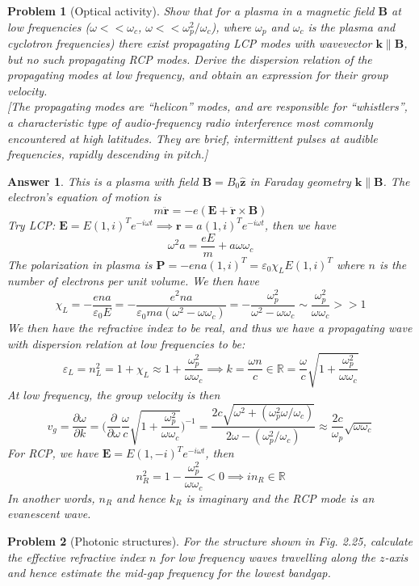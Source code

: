 \documentclass[a4paper]{article}
\newtheorem{ans}{Answer}
\theoremstyle{new}
\newtheorem{qns}{Problem}
\begin{document}
\begin{qns}[Optical activity]
Show that for a plasma in a magnetic field $\mathbf{B}$ at low frequencies ($\omega<<\omega_c$, $\omega<<\omega_p^2/\omega_c$), where $\omega_p$ and $\omega_c$ is the plasma and cyclotron frequencies) there exist propagating LCP modes with wavevector $\mathbf{k}\parallel\mathbf{B}$, but no such propagating RCP modes. Derive the dispersion relation of the propagating modes at low frequency, and obtain an expression for their group velocity.\\[5pt]
[The propagating modes are “helicon” modes, and are responsible for “whistlers”, a characteristic type of audio-frequency radio interference most commonly encountered at high latitudes. They are brief, intermittent pulses at audible frequencies, rapidly descending in pitch.]
\end{qns}
\newpage
\begin{ans}
This is a plasma with field $\mathbf{B}=B_0\mathbf{\hat{z}}$ in Faraday geometry $\mathbf{k}\parallel\mathbf{B}$. The electron's equation of motion is
$$m\mathbf{\ddot{r}}=-e(\mathbf{E}+\mathbf{\ddot{r}}\times\mathbf{B})$$
Try LCP: $\mathbf{E}=E(1,i)^Te^{-i\omega t}\implies\mathbf{r}=a(1,i)^Te^{-i\omega t}$, then we have
$$\omega^2a=\frac{eE}{m}+a\omega\omega_c$$
The polarization in plasma is $\mathbf{P}=-ena(1,i)^T=\varepsilon_0\chi_LE(1,i)^T$ where $n$ is the number of electrons per unit volume. We then have
$$\chi_L=-\frac{ena}{\varepsilon_0E}=-\frac{e^2na}{\varepsilon_0ma(\omega^2-\omega\omega_c)}=-\frac{\omega_p^2}{\omega^2-\omega\omega_c}\sim\frac{\omega_p^2}{\omega\omega_c}>>1$$
We then have the refractive index to be real, and thus we have a propagating wave with dispersion relation at low frequencies to be:
$$\varepsilon_L=n_L^2=1+\chi_L\approx 1+\frac{\omega_p^2}{\omega\omega_c}\implies k=\frac{\omega n}{c}\in\mathbb{R}=\frac{\omega}{c}\sqrt{1+\frac{\omega_p^2}{\omega\omega_c}}$$
At low frequency, the group velocity is then
$$v_g=\frac{\partial\omega}{\partial k}=\bigg(\frac{\partial}{\partial\omega}\frac{\omega}{c}\sqrt{1+\frac{\omega_p^2}{\omega\omega_c}}\bigg)^{-1}=\frac{2c\sqrt{\omega^2+(\omega_p^2\omega/\omega_c)}}{2\omega-(\omega_p^2/\omega_c)}\approx\frac{2c}{\omega_p}\sqrt{\omega\omega_c}$$
For RCP, we have $\mathbf{E}=E(1,-i)^Te^{-i\omega t}$, then
$$n_R^2=1-\frac{\omega_p^2}{\omega\omega_c}<0\implies in_R\in\mathbb{R}$$
In another words, $n_R$ and hence $k_R$ is imaginary and the RCP mode is an evanescent wave.
\end{ans}
\begin{qns}[Photonic structures]
For the structure shown in Fig. 2.25, calculate the effective refractive index $n$ for low frequency waves travelling along the $z$-axis and hence estimate the mid-gap frequency for the lowest bandgap.
\end{qns}
\end{document}
